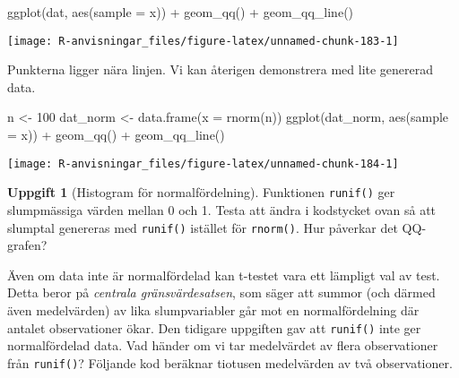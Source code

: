 \documentclass[
]{book}
\newenvironment{Shaded}{\begin{snugshade}}{\end{snugshade}}
\newcommand{\AttributeTok}[1]{\textcolor[rgb]{0.77,0.63,0.00}{#1}}
\newcommand{\DecValTok}[1]{\textcolor[rgb]{0.00,0.00,0.81}{#1}}
\newcommand{\FunctionTok}[1]{\textcolor[rgb]{0.00,0.00,0.00}{#1}}
\newcommand{\NormalTok}[1]{#1}
\newcommand{\OtherTok}[1]{\textcolor[rgb]{0.56,0.35,0.01}{#1}}
\newcommand{\SpecialCharTok}[1]{\textcolor[rgb]{0.00,0.00,0.00}{#1}}
\theoremstyle{definition}
\theoremstyle{definition}
\theoremstyle{definition}
\newtheorem{exercise}{Uppgift}[chapter]
\theoremstyle{definition}
\theoremstyle{remark}
\begin{document}
\begin{Shaded}
\begin{Highlighting}[]
\FunctionTok{ggplot}\NormalTok{(dat, }\FunctionTok{aes}\NormalTok{(}\AttributeTok{sample =}\NormalTok{ x)) }\SpecialCharTok{+} \FunctionTok{geom\_qq}\NormalTok{() }\SpecialCharTok{+} \FunctionTok{geom\_qq\_line}\NormalTok{()}
\end{Highlighting}
\end{Shaded}

\begin{center}\texttt{[image: R-anvisningar\_files/figure-latex/unnamed-chunk-183-1]} \end{center}

Punkterna ligger nära linjen. Vi kan återigen demonstrera med lite genererad data.

\begin{Shaded}
\begin{Highlighting}[]
\NormalTok{n }\OtherTok{\textless{}{-}} \DecValTok{100}
\NormalTok{dat\_norm }\OtherTok{\textless{}{-}} \FunctionTok{data.frame}\NormalTok{(}\AttributeTok{x =} \FunctionTok{rnorm}\NormalTok{(n))}
\FunctionTok{ggplot}\NormalTok{(dat\_norm, }\FunctionTok{aes}\NormalTok{(}\AttributeTok{sample =}\NormalTok{ x)) }\SpecialCharTok{+} \FunctionTok{geom\_qq}\NormalTok{() }\SpecialCharTok{+} \FunctionTok{geom\_qq\_line}\NormalTok{()}
\end{Highlighting}
\end{Shaded}

\begin{center}\texttt{[image: R-anvisningar\_files/figure-latex/unnamed-chunk-184-1]} \end{center}

\begin{exercise}[Histogram för normalfördelning]
Funktionen \texttt{runif()} ger slumpmässiga värden mellan 0 och 1. Testa att ändra i kodstycket ovan så att slumptal genereras med \texttt{runif()} istället för \texttt{rnorm()}. Hur påverkar det QQ-grafen?
\end{exercise}

Även om data inte är normalfördelad kan t-testet vara ett lämpligt val av test. Detta beror på \emph{centrala gränsvärdesatsen}, som säger att summor (och därmed även medelvärden) av lika slumpvariabler går mot en normalfördelning där antalet observationer ökar. Den tidigare uppgiften gav att \texttt{runif()} inte ger normalfördelad data. Vad händer om vi tar medelvärdet av flera observationer från \texttt{runif()}? Följande kod beräknar tiotusen medelvärden av två observationer.
\end{document}
